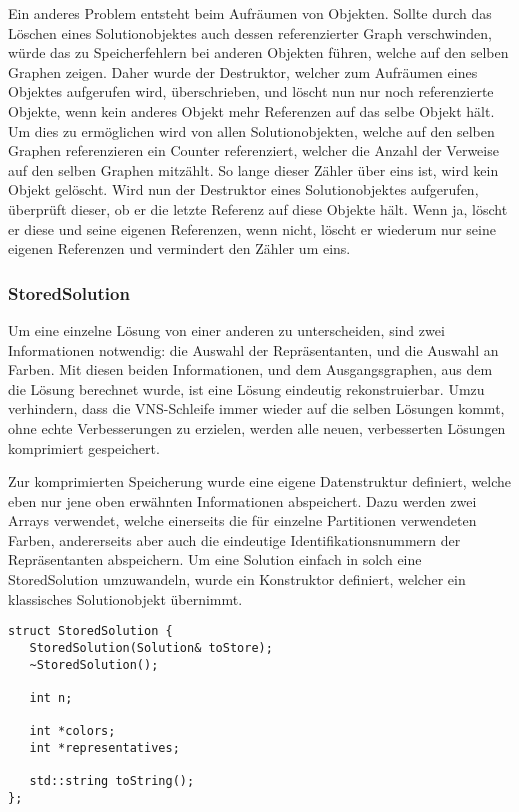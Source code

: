 Ein anderes Problem entsteht beim Aufräumen von Objekten. Sollte durch das Löschen eines Solutionobjektes auch dessen referenzierter Graph verschwinden, würde das zu Speicherfehlern bei anderen Objekten führen, 
welche auf den selben Graphen zeigen. Daher wurde der Destruktor, welcher zum Aufräumen eines Objektes aufgerufen wird, überschrieben, und löscht nun nur noch referenzierte Objekte, wenn kein anderes Objekt
mehr Referenzen auf das selbe Objekt hält. Um dies zu ermöglichen wird von allen Solutionobjekten, welche auf den selben Graphen referenzieren ein Counter referenziert, welcher die Anzahl der
Verweise auf den selben Graphen mitzählt. So lange dieser Zähler über eins ist, wird kein Objekt gelöscht. Wird nun der Destruktor eines Solutionobjektes aufgerufen, überprüft dieser, ob er die letzte
Referenz auf diese Objekte hält. Wenn ja, löscht er diese und seine eigenen Referenzen, wenn nicht, löscht er wiederum nur seine eigenen Referenzen und vermindert den Zähler um eins.

\subsubsection{StoredSolution}
Um eine einzelne Lösung von einer anderen zu unterscheiden, sind zwei Informationen notwendig: die Auswahl der Repräsentanten, und die Auswahl 
an Farben. Mit diesen beiden Informationen, und dem Ausgangsgraphen, aus dem die Lösung berechnet wurde, ist eine Lösung eindeutig rekonstruierbar.
Umzu verhindern, dass die VNS-Schleife immer wieder auf die selben Lösungen kommt, ohne echte Verbesserungen zu erzielen, werden alle neuen, verbesserten
Lösungen komprimiert gespeichert. 

Zur komprimierten Speicherung wurde eine eigene Datenstruktur definiert, welche eben nur jene oben erwähnten Informationen abspeichert. 
Dazu werden zwei Arrays verwendet, welche einerseits die für einzelne Partitionen verwendeten Farben, andererseits aber auch die 
eindeutige Identifikationsnummern der Repräsentanten abspeichern. Um eine Solution einfach in solch eine StoredSolution umzuwandeln, wurde
ein Konstruktor definiert, welcher ein klassisches Solutionobjekt übernimmt. 

\singlespacing
\begin{lstlisting}[caption={Die Signatur von StoredSolution},label={lst:stored}]
struct StoredSolution {
   StoredSolution(Solution& toStore);
   ~StoredSolution();
   
   int n;
   
   int *colors;
   int *representatives;
   
   std::string toString();
};
\end{lstlisting}

